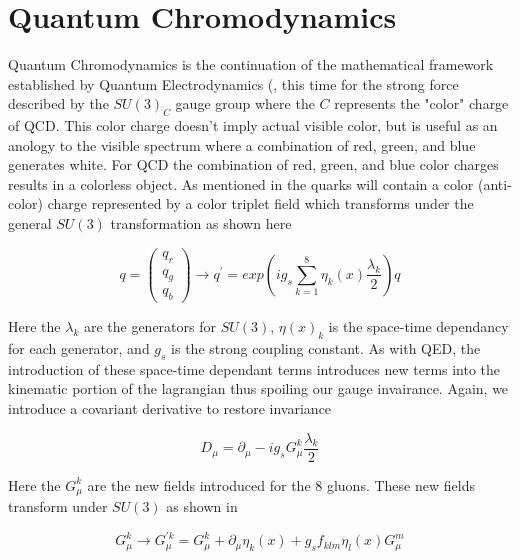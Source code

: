 \section{Quantum Chromodynamics} \label{sec:theory:qcd}

Quantum Chromodynamics is the continuation of the mathematical framework
established by Quantum Electrodynamics (, this time
for the strong force described by the $SU(3)_C$ gauge group where the $C$
represents the "color" charge of QCD.  This color charge doesn't imply actual
visible color, but is useful as an anology to the visible spectrum where a
combination of red, green, and blue generates white.  For QCD the combination of
red, green, and blue color charges results in a colorless object.  As mentioned
in  the quarks will contain a color
(anti-color) charge represented by a color triplet field which transforms under
the general $SU(3)$ transformation as shown here

\begin{equation}
q = \left( \begin{matrix} q_{r} \\ q_{g} \\ q_{b} \end{matrix} \right)
\rightarrow q^{'} = exp \left( ig_{s} \sum_{k=1}^{8} \eta_{k}(x)
\frac{\lambda_k}{2} \right) q
\end{equation}

Here the $\lambda_{k}$ are the generators for $SU(3)$, $\eta(x)_{k}$ is the
space-time dependancy for each generator, and  $g_s$ is the strong coupling constant.
As with QED, the introduction of these space-time dependant terms introduces new
terms into the kinematic portion of the lagrangian thus spoiling our gauge
invairance.  Again, we introduce a covariant derivative to restore invariance

\begin{equation}
D_{\mu} = \partial_{\mu} - ig_{s}G_{\mu}^{k}\frac{\lambda_{k}}{2}
\end{equation}

Here the $G_{\mu}^{k}$ are the new fields introduced for the 8 gluons.  These
new fields transform under $SU(3)$ as shown in

\begin{equation} \label{eq:qcd:gluon_field}
G_{\mu}^{k} \rightarrow G_{\mu}^{'k} = G_{\mu}^{k} + \partial_{\mu}\eta_{k}(x) +
g_{s}f_{klm}\eta_{l}(x)G_{\mu}^{m}
\end{equation}

